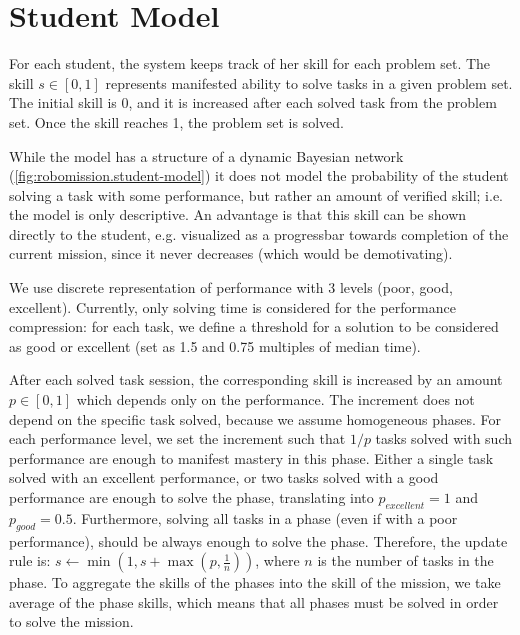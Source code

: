 \section{Student Model}
\label{sec:robomission.student}

For each student, the system keeps track of her skill for each problem set. %
The skill $s \in [0, 1]$ represents manifested ability to solve tasks in
a given problem set. The initial skill is 0, and it is increased after each solved
task from the problem set. Once the skill reaches 1, the problem set is solved.

While the model has a structure of a dynamic Bayesian network
(\cref{fig:robomission.student-model}) %
it does not model the probability of the student solving a task with some performance,
but rather an amount of verified skill;
i.e. the model is only descriptive.
An advantage is that this skill can be shown directly to the student,
e.g. visualized as a progressbar towards completion of the current mission,
since it never decreases (which would be demotivating).

We use discrete representation of performance with 3 levels (poor, good,
excellent). Currently, only solving time is considered for the performance
compression: for each task, we define a threshold for a solution to be
considered as good or excellent
(set as 1.5 and 0.75 multiples of median time).

After each solved task session, the corresponding skill is increased by
an amount $p \in [0, 1]$ which depends only on the performance.
The increment does not depend on the specific task solved, because we assume homogeneous phases.
For each performance level, we set the increment such that $1/p$ tasks solved
with such performance are enough to manifest mastery in this phase.
Either a single task solved with an excellent performance, or two
tasks solved with a good performance are enough to solve the phase,
translating into $p_{excellent} = 1$ and $p_{good} = 0.5$.
Furthermore, solving all tasks in a phase (even if with a poor performance),
should be always enough to solve the phase.
Therefore, the update rule is:
$s \leftarrow \min(1, s + \max(p, \frac{1}{n}))$,
where $n$ is the number of tasks in the phase.
To aggregate the skills of the phases into the skill of the mission,
we take average of the phase skills, which means
that all phases must be solved in order to solve the mission.

